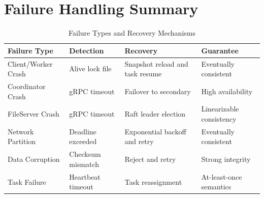 \documentclass[11pt, a4paper]{article}
\begin{document}
\section{Failure Handling Summary}

\begin{table}[htbp]
    \centering
    \caption{Failure Types and Recovery Mechanisms}
    \label{tab:failures}
    \begin{tabular}{@{}p{3.5cm}p{4cm}p{5cm}p{3cm}@{}}
        \toprule
        \textbf{Failure Type} & \textbf{Detection} & \textbf{Recovery}               & \textbf{Guarantee}       \\ \midrule
        Client/Worker Crash   & Alive lock file    & Snapshot reload and task resume & Eventually consistent    \\
        Coordinator Crash     & gRPC timeout       & Failover to secondary           & High availability        \\
        FileServer Crash      & gRPC timeout       & Raft leader election            & Linearizable consistency \\
        Network Partition     & Deadline exceeded  & Exponential backoff and retry   & Eventually consistent    \\
        Data Corruption       & Checksum mismatch  & Reject and retry                & Strong integrity         \\
        Task Failure          & Heartbeat timeout  & Task reassignment               & At-least-once semantics  \\ \bottomrule
    \end{tabular}
\end{table}
\end{document}
